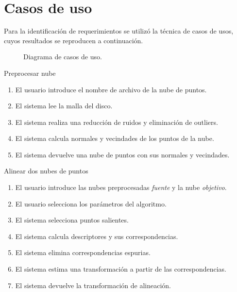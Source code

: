 \section{Casos de uso}
Para la identificación de requerimientos se utilizó la técnica de casos de usos,
cuyos resultados se reproducen a continuación.

\begin{figure}[h]
	\caption{\label{fig:casos_de_uso}Diagrama de casos de uso.}
\end{figure}

\begin{CasoDeUso}{Preprocesar nube}
	\CUNormal
	\begin{enumerate}
		\item El usuario introduce el nombre de archivo de la nube de puntos.
		\item El sistema lee la malla del disco.
		\item El sistema realiza una reducción de ruidos y eliminación de outliers.
		\item El sistema calcula normales y vecindades de los puntos de la nube.
		\item El sistema devuelve una nube de puntos con sus normales y vecindades.
	\end{enumerate}
\end{CasoDeUso}

\begin{CasoDeUso}{Alinear dos nubes de puntos}
	\CUNormal
	\begin{enumerate}
		\item El usuario introduce las nubes preprocesadas \emph{fuente} y la nube \emph{objetivo}. 
		\item El usuario selecciona los parámetros del algoritmo.
		\item El sistema selecciona puntos salientes.
		\item El sistema calcula descriptores y sus correspondencias.
		\item El sistema elimina correspondencias espurias.
		\item El sistema estima una transformación a partir de las correspondencias.
		\item El sistema devuelve la transformación de alineación.
	\end{enumerate}
\end{CasoDeUso}

